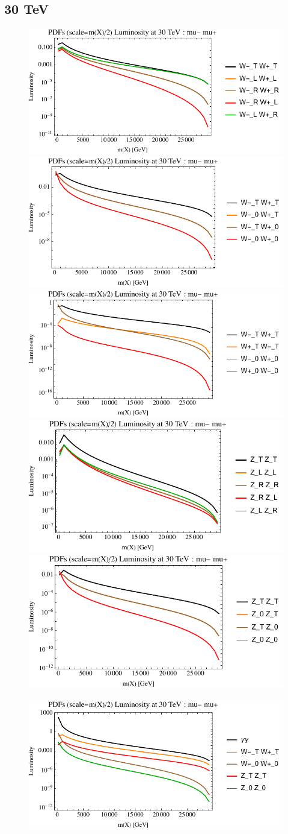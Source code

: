 \documentclass[a4paper,11pt]{article}
\begin{document}
\clearpage
\subsection{30 TeV}

\begin{figure}[ht]
\includegraphics[width=0.46\linewidth]{Notebooks/PlotLumi/30TeV/lumis/plotWWpolRandL.pdf}
\includegraphics[width=0.46\linewidth]{Notebooks/PlotLumi/30TeV/lumis/plotWWpolTand0.pdf}
\includegraphics[width=0.46\linewidth]{Notebooks/PlotLumi/30TeV/lumis/plotWmWpandWpWm.pdf}
\includegraphics[width=0.46\linewidth]{Notebooks/PlotLumi/30TeV/lumis/plotZZpolRandL.pdf}
\includegraphics[width=0.46\linewidth]{Notebooks/PlotLumi/30TeV/lumis/plotZZpolTand0.pdf}
\end{figure}

\begin{figure}
\includegraphics[width=0.46\linewidth]{Notebooks/PlotLumi/30TeV/lumis/plotgammaWZ.pdf}
\end{figure}
\end{document}
